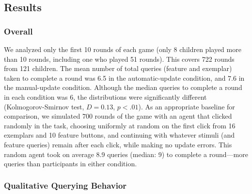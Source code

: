 \documentclass[man,floatsintext]{apa6}
\begin{document}
\subsection{Results}

\subsubsection{Overall}

We analyzed only the first 10 rounds of each game (only 8 children played more than 
10 rounds, including one who played 51 rounds). This covers 722 rounds from 121 
children. The mean number of total queries (feature and exemplar) taken to complete a round was 6.5 in the automatic-update condition, and 7.6 in the manual-update condition. Although the median queries to complete a round in each condition was 6, the distributions were significantly different (Kolmogorov-Smirnov test, $D = 
0.13$, $p<.01$). As an appropriate baseline for comparison, we simulated 700 rounds of the game with an agent that clicked
randomly in the task, choosing uniformly at random on the first click from 16 exemplars and 10 feature buttons, and continuing with whatever stimuli (and feature queries) remain after each click, while making no update errors. This random agent took on average 8.9 queries (median: 9) to complete a round---more queries than participants in either condition.

\subsubsection{Qualitative Querying Behavior}
\end{document}
